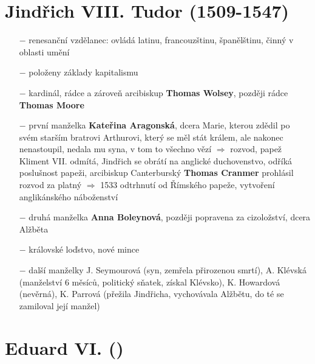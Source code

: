 \documentclass{article}
\begin{document}
\section*{Jindřich VIII. Tudor (1509-1547)}
\begin{itemize}
    \vspace{-0.5em}
    \setlength\itemsep{0.15em}
    \item[$-$] renesanční vzdělanec: ovládá latinu, francouzštinu, španělštinu, činný v oblasti umění
    \item[$-$] položeny základy kapitalismu
    \item[$-$] kardinál, rádce a zároveň arcibiskup \textbf{Thomas Wolsey}, později rádce \textbf{Thomas Moore}
    \item[$-$] první manželka \textbf{Kateřina Aragonská}, dcera Marie, kterou zdědil po svém starším bratrovi Arthurovi, který se měl stát králem, ale nakonec nenastoupil, nedala mu syna, v tom to všechno vězí $\Rightarrow$ rozvod, papež Kliment VII. odmítá, Jindřich se obrátí na anglické duchovenstvo, odříká poslušnost papeži, arcibiskup Canterburský \textbf{Thomas Cranmer} prohlásil rozvod za platný $\Rightarrow$ 1533 odtrhnutí od Římského papeže, vytvoření anglikánského náboženství
    \item[$-$] druhá manželka \textbf{Anna Boleynová}, později popravena za cizoložství, dcera Alžběta
    \item[$-$] královské loďstvo, nové mince
    \item[$-$] další manželky J. Seymourová (syn, zemřela přirozenou smrtí), A. Klévská (manželství 6 měsíců, politický sňatek, získal Klévsko), K. Howardová (nevěrná), K. Parrová (přežila Jindřicha, vychovávala Alžbětu, do té se zamiloval její manžel)
\end{itemize}

\section*{Eduard VI. ()}
\end{document}
